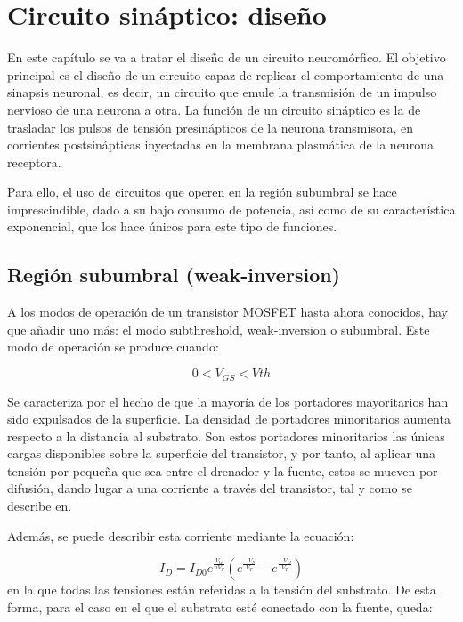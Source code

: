 \chapter{Circuito sináptico: diseño}

En este capítulo se va a tratar el diseño de un circuito neuromórfico. El objetivo principal es el diseño de un circuito capaz de replicar el comportamiento de una sinapsis neuronal, es decir, un circuito que emule la transmisión de un impulso nervioso de una neurona a otra. La función de un circuito sináptico es la de trasladar los pulsos de tensión presinápticos de la neurona transmisora, en corrientes postsinápticas inyectadas en la membrana plasmática de la neurona receptora. 

Para ello, el uso de circuitos que operen en la región subumbral se hace imprescindible, dado a su bajo consumo de potencia, así como de su característica exponencial, que los hace únicos para este tipo de funciones.

\section{Región subumbral (weak-inversion)}

A los modos de operación de un transistor MOSFET hasta ahora conocidos, hay que añadir uno más: el modo subthreshold, weak-inversion o subumbral. Este modo de operación se produce cuando:

\begin{equation}
0<V_{GS}<V{th}
\end{equation}

Se caracteriza por el hecho de que la mayoría de los portadores mayoritarios han sido expulsados de la superficie. La densidad de portadores minoritarios aumenta respecto a la distancia al substrato. Son estos portadores minoritarios las únicas cargas disponibles sobre la superficie del transistor, y por tanto, al aplicar una tensión por pequeña que sea entre el drenador y la fuente, estos se mueven por difusión, dando lugar a una corriente a través del transistor, tal y como se describe en\cite{vittoz2006origins}.

Además, se puede describir esta corriente mediante la ecuación:

\begin{equation}
I_D=I_{D0}e^{\frac{V_G}{nV_T}}(e^{\frac{-V_S}{V_T}}-e^{\frac{-V_D}{V_T}})
\end{equation}
\noindent
en la que todas las tensiones están referidas a la tensión del substrato. De esta forma, para el caso en el que el substrato esté conectado con la fuente, queda:

